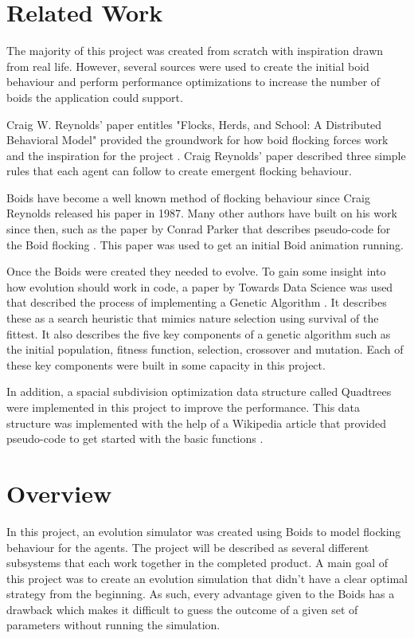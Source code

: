 \documentclass{egpubl}
\begin{document}
\section{Related Work}
The majority of this project was created from scratch with inspiration drawn from real life. However, several sources were used to create the initial boid behaviour and perform performance optimizations to increase the number of boids the application could support.
\par
Craig W. Reynolds' paper entitles "Flocks, Herds, and School: A Distributed Behavioral Model" provided the groundwork for how boid flocking forces work and the inspiration for the project \cite{Boids}. Craig Reynolds' paper described three simple rules that each agent can follow to create emergent flocking behaviour.
\par
Boids have become a well known method of flocking behaviour since Craig Reynolds released his paper in 1987. Many other authors have built on his work since then, such as the paper by Conrad Parker that describes pseudo-code for the Boid flocking \cite{CParker}. This paper was used to get an initial Boid animation running. 
\par
Once the Boids were created they needed to evolve. To gain some insight into how evolution should work in code, a paper by Towards Data Science was used that described the process of implementing a Genetic Algorithm \cite{vMall}. It describes these as a search heuristic that mimics nature selection using survival of the fittest. It also describes the five key components of a genetic algorithm such as the initial population, fitness function, selection, crossover and mutation. Each of these key components were built in some capacity in this project.
\par
In addition, a spacial subdivision optimization data structure called Quadtrees were implemented in this project to improve the performance. This data structure was implemented with the help of a Wikipedia article that provided pseudo-code to get started with the basic functions \cite{wiki}.
\section{Overview}
In this project, an evolution simulator was created using Boids to model flocking behaviour for the agents. The project will be described as several different subsystems that each work together in the completed product. A main goal of this project was to create an evolution simulation that didn't have a clear optimal strategy from the beginning. As such, every advantage given to the Boids has a drawback which makes it difficult to guess the outcome of a given set of parameters without running the simulation.
\end{document}
